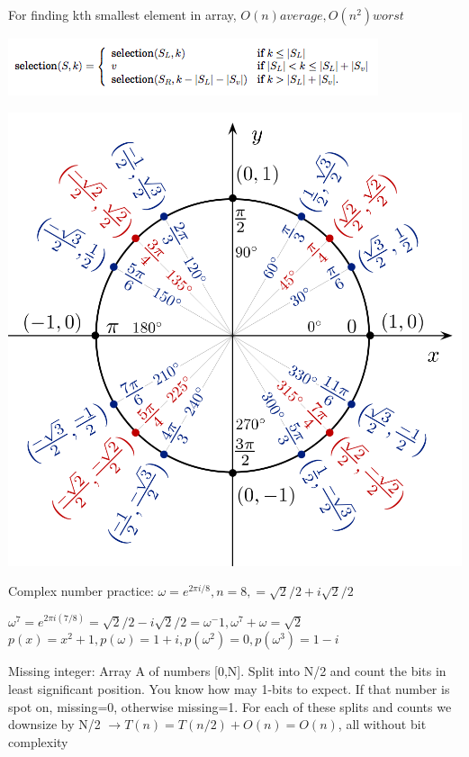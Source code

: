 \documentclass[10pt,landscape]{article}
\newenvironment{Figure}
  {\par\medskip\noindent\minipage{\linewidth}}
  {\endminipage\par\medskip}
\newcommand\myfigure[1]{%
\medskip\noindent\begin{minipage}{\columnwidth}
\centering%
#1%
\end{minipage}\medskip}
\begin{document}
\begin{multicols}{3}
For finding kth smallest element in array, $O(n) average, O(n^2) worst$
\begin{Figure}
 \includegraphics[scale=0.5]{selection}
\end{Figure}
\begin{Figure}
 \includegraphics[scale=0.2]{unit_circle_2}
\end{Figure}
%
%

Complex number practice: $\omega = e^{2\pi i/8},n=8,=\sqrt{2}/2 + i\sqrt{2}/2$

$\omega^7 = e^{2\pi i (7/8)}=\sqrt{2}/2 - i\sqrt{2}/2=\omega^-1,\omega^7 + \omega = \sqrt{2}$
$p(x)=x^2+1, p(\omega)=1+i,p(\omega^2)=0,p(\omega^3)=1-i$


Missing integer: Array A of numbers [0,N]. Split into N/2 and count the bits in least significant position. You know how may 1-bits to expect. If that number is spot on, missing=0, otherwise missing=1. For each of these splits and counts we downsize by N/2 $\rightarrow T(n)=T(n/2)+O(n)=O(n)$, all without bit complexity


\end{multicols}
\end{document}
